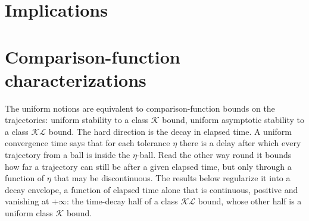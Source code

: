 



\section{Implications}











\section{Comparison-function characterizations}

The uniform notions are equivalent to comparison-function bounds on the trajectories: uniform
stability to a class $\mathcal{K}$ bound, uniform asymptotic stability to a class $\mathcal{KL}$
bound.  The hard direction is the decay in elapsed time.  A uniform convergence time says that for each tolerance $\eta$ there is a delay after which every
trajectory from a ball is inside the $\eta$-ball.  Read the other way round it bounds how far a
trajectory can still be after a given elapsed time, but only through a function of $\eta$ that may
be discontinuous.  The results below regularize it into a decay envelope, a function of elapsed
time alone that is continuous, positive and vanishing at $+\infty$: the time-decay half of a class
$\mathcal{KL}$ bound, whose other half is a uniform class $\mathcal{K}$ bound.

